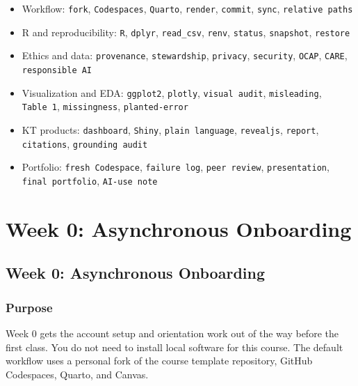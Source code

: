\documentclass[
  letterpaper,
  DIV=11,
  numbers=noendperiod,
  oneside]{scrreprt}
\providecommand{\tightlist}{%
  \setlength{\itemsep}{0pt}\setlength{\parskip}{0pt}}
\begin{document}
\begin{itemize}
\tightlist
\item
  Workflow: \texttt{fork}, \texttt{Codespaces}, \texttt{Quarto},
  \texttt{render}, \texttt{commit}, \texttt{sync},
  \texttt{relative\ paths}
\item
  R and reproducibility: \texttt{R}, \texttt{dplyr}, \texttt{read\_csv},
  \texttt{renv}, \texttt{status}, \texttt{snapshot}, \texttt{restore}
\item
  Ethics and data: \texttt{provenance}, \texttt{stewardship},
  \texttt{privacy}, \texttt{security}, \texttt{OCAP}, \texttt{CARE},
  \texttt{responsible\ AI}
\item
  Visualization and EDA: \texttt{ggplot2}, \texttt{plotly},
  \texttt{visual\ audit}, \texttt{misleading}, \texttt{Table\ 1},
  \texttt{missingness}, \texttt{planted-error}
\item
  KT products: \texttt{dashboard}, \texttt{Shiny},
  \texttt{plain\ language}, \texttt{revealjs}, \texttt{report},
  \texttt{citations}, \texttt{grounding\ audit}
\item
  Portfolio: \texttt{fresh\ Codespace}, \texttt{failure\ log},
  \texttt{peer\ review}, \texttt{presentation},
  \texttt{final\ portfolio}, \texttt{AI-use\ note}
\end{itemize}

\part{Week 0: Asynchronous Onboarding}

\chapter*{Week 0: Asynchronous
Onboarding}\label{week-0-asynchronous-onboarding-1}


\section*{Purpose}\label{purpose}


Week 0 gets the account setup and orientation work out of the way before
the first class. You do not need to install local software for this
course. The default workflow uses a personal fork of the course template
repository, GitHub Codespaces, Quarto, and Canvas.
\end{document}
